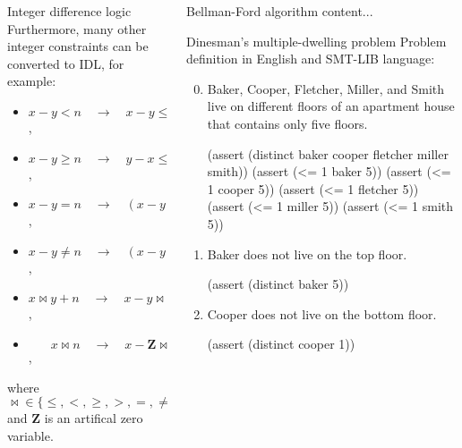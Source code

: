 \documentclass{beamer}
\begin{document}
\begin{frame}[fragile,t]
\begin{columns}[t,onlytextwidth]
\begin{column}{0.485\textwidth}
\begin{block}{Integer difference logic}
			Furthermore, many other integer constraints can be converted to IDL, for example:
			\begin{itemize}
				\item $x - y < n \quad\to\quad x - y \leq n - 1$,
				\item $x - y \geq n \quad\to\quad y - x \leq -n$,
				\item $x - y = n \quad\to\quad (x - y \leq n) \land (x - y \geq n)$,
				\item $x - y \neq n \quad\to\quad (x - y < n) \lor (x - y > n)$,
				\item $x \bowtie y + n \quad\to\quad x - y \bowtie n$,
				\item $\quad\;\;\: x \bowtie n \quad\to\quad x - \mathbf{Z} \bowtie n$,
			\end{itemize}
			where ${\bowtie} \in \{\leq, <, \geq, >, =, \neq\}$ and $\mathbf{Z}$ is an artifical zero variable.
		\end{block}
	\end{column}

	\begin{column}{0.485\textwidth}
		\begin{block}{Bellman-Ford algorithm}
			content...
		\end{block}
	
		\begin{block}{Dinesman's multiple-dwelling problem}
			Problem definition in English and SMT-LIB language:
			\begin{enumerate}
				\setcounter{enumi}{-1} %
				
				\item Baker, Cooper, Fletcher, Miller, and Smith live on different floors of an apartment house that contains only five floors.
				\begin{smtlib}
					(assert (distinct baker cooper fletcher miller smith))
					(assert (<= 1 baker 5))
					(assert (<= 1 cooper 5))
					(assert (<= 1 fletcher 5))
					(assert (<= 1 miller 5))
					(assert (<= 1 smith 5))
				\end{smtlib}
				
				\item Baker does not live on the top floor.
				\begin{smtlib}
					(assert (distinct baker 5))
				\end{smtlib}
			
				\item Cooper does not live on the bottom floor.
				\begin{smtlib}
					(assert (distinct cooper 1))
				\end{smtlib}
				

\end{enumerate}
\end{block}
\end{column}
\end{columns}
\end{frame}
\end{document}
